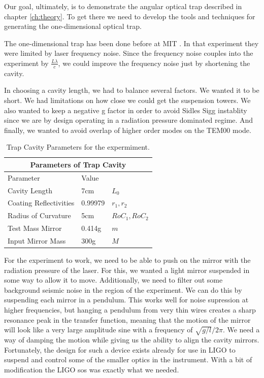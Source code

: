 
Our goal, ultimately, is to demonstrate the angular optical trap described in
chapter \ref{ch:theory}.
To get there we need to develop the tools and techniques for generating the
one-dimensional optical trap.

The one-dimensional trap has been done before at MIT \cite{Corbitt07}.
In that experiment they were limited by laser frequency noise.
Since the frequency noise couples into the experiment by $\frac{L \lambda}{c}$,
we could improve the frequency noise just by shortening the cavity.

In choosing a cavity length, we had to balance several factors. We wanted it to
be short. We had limitations on how close we could get the suspension towers.
We also wanted to keep a negative g factor in order to avoid Sidles Sigg
instablity since we are by design operating in a radiation pressure dominated
regime.
And finally, we wanted to avoid overlap of higher order modes on the TEM00 mode.

\begin{table}
\begin{center}
\begin{tabular}{|l|l|l|}
  \hline
  \multicolumn{3}{|c|}{Parameters of Trap Cavity} \\
  \hline
  \hline
  Parameter & Value & \\
  \hline
  Cavity Length & 7cm & $L_0$ \\
  Coating Reflectivities & 0.99979 & $r_1,r_2$ \\
  Radius of Curvature & 5cm & $RoC_1,RoC_2$ \\
  Test Mass Mirror & 0.414g & $m$ \\
  Input Mirror Mass & 300g & $M$ \\
  \hline
\end{tabular}
\end{center}
\caption[Trap Cavity Parameters]{Trap Cavity Parameters for the expermiment.}
\end{table}


For the experiment to work, we need to be able to push on the mirror with the
radiation pressure of the laser.
For this, we wanted a light mirror suspended in some way to allow it to move.
Additionally, we need to filter out some background seismic noise in the
region of the experiment.
We can do this by suspending each mirror in a pendulum.
This works well for noise supression at higher frequencies, but hanging a
pendulum from very thin wires creates a sharp resonance peak in the transfer
function, meaning that the motion of the mirror will look like a very large
amplitude sine with a frequency of $\sqrt{g/l}/2\pi$.
We need a way of damping the motion while giving us the ability to align the
cavity mirrors.
Fortunately, the design for such a device exists already for use in LIGO to
suspend and control some of the smaller optics in the instrument.
With a bit of modification the LIGO \ac{sos} was exactly what we needed.

